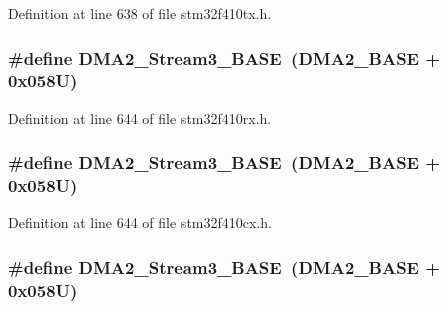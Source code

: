 Definition at line 638 of file stm32f410tx.\+h.

\subsubsection[{\texorpdfstring{D\+M\+A2\+\_\+\+Stream3\+\_\+\+B\+A\+SE}{DMA2_Stream3_BASE}}]{\setlength{\rightskip}{0pt plus 5cm}\#define D\+M\+A2\+\_\+\+Stream3\+\_\+\+B\+A\+SE~({\bf D\+M\+A2\+\_\+\+B\+A\+SE} + 0x058\+U)}\hypertarget{group___peripheral__registers__structures_gaf3a9480e08c6ae94f4482e0cdaebdd17}{}\label{group___peripheral__registers__structures_gaf3a9480e08c6ae94f4482e0cdaebdd17}


Definition at line 644 of file stm32f410rx.\+h.

\subsubsection[{\texorpdfstring{D\+M\+A2\+\_\+\+Stream3\+\_\+\+B\+A\+SE}{DMA2_Stream3_BASE}}]{\setlength{\rightskip}{0pt plus 5cm}\#define D\+M\+A2\+\_\+\+Stream3\+\_\+\+B\+A\+SE~({\bf D\+M\+A2\+\_\+\+B\+A\+SE} + 0x058\+U)}\hypertarget{group___peripheral__registers__structures_gaf3a9480e08c6ae94f4482e0cdaebdd17}{}\label{group___peripheral__registers__structures_gaf3a9480e08c6ae94f4482e0cdaebdd17}


Definition at line 644 of file stm32f410cx.\+h.

\subsubsection[{\texorpdfstring{D\+M\+A2\+\_\+\+Stream3\+\_\+\+B\+A\+SE}{DMA2_Stream3_BASE}}]{\setlength{\rightskip}{0pt plus 5cm}\#define D\+M\+A2\+\_\+\+Stream3\+\_\+\+B\+A\+SE~({\bf D\+M\+A2\+\_\+\+B\+A\+SE} + 0x058\+U)}\hypertarget{group___peripheral__registers__structures_gaf3a9480e08c6ae94f4482e0cdaebdd17}{}\label{group___peripheral__registers__structures_gaf3a9480e08c6ae94f4482e0cdaebdd17}



